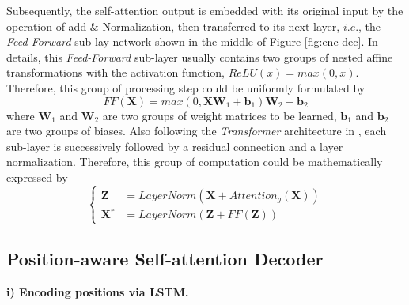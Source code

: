 \documentclass[review]{elsarticle}
\begin{document}
Subsequently, the self-attention output is  embedded with its original input by the operation of add \& Normalization, then transferred to its next layer, $i.e.$, the \emph{Feed-Forward} sub-lay network shown in the middle of Figure \ref{fig:enc-dec}. In details, this \emph{Feed-Forward} sub-layer usually contains two groups of nested affine transformations with the activation function, $ReLU(x)=max(0,x)$. Therefore, this group of processing step could be uniformly formulated by
\begin{equation}
   FF(\bm{X}) = { max}(0, \bm{X}\bm{{W}}_1 + \bm{b}_1)\bm{W}_2 + \bm{b}_2 \label{ff}
\end{equation}
where \(\bm{W}_1\) and \(\bm{W}_2\) are two groups of weight matrices to be learned, $\bm{b}_1$ and $\bm{b}_2$ are two groups of biases. Also following the \emph{Transformer} architecture in \cite{vaswani2017attention}, each sub-layer is successively followed by a residual connection and a layer normalization. Therefore, this group of computation could be mathematically expressed by
\begin{equation}
\left\{
\begin{aligned}
\bm{Z} &=LayerNorm(\bm{X} + Attention_g(\bm{X})) \\
\bm{X}^r &= LayerNorm(\bm{Z} + FF(\bm{Z}))
\end{aligned} \right.
\end{equation}


\subsection{Position-aware Self-attention Decoder}

\textbf{i) Encoding positions via LSTM.}
\end{document}
